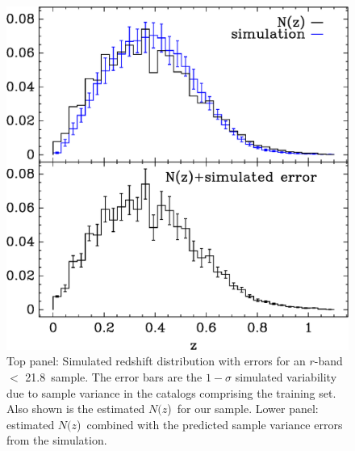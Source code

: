 \documentclass[preprint]{aastex}
\newcommand{\rmax}{21.8}
\newcommand{\Nofz}{$N(z$)}
\begin{document}
\begin{figure}[t]\centering
    \includegraphics[scale=0.6]{figures/nzsigf-edges-12-nofz-sim-errors-2panel.eps}

    \caption{Top panel: Simulated redshift distribution with errors for an
    $r$-band $<$ \rmax\ sample.  The error bars are the $1-\sigma$ simulated
    variability due to sample variance in the catalogs comprising the training
    set.  Also shown is the estimated \Nofz\ for our sample.  Lower panel:
    estimated \Nofz\ combined with the predicted sample variance errors from
    the simulation.}

    \label{fig:ebars}
    \vspace{2em}
\end{figure}

\end{document}
